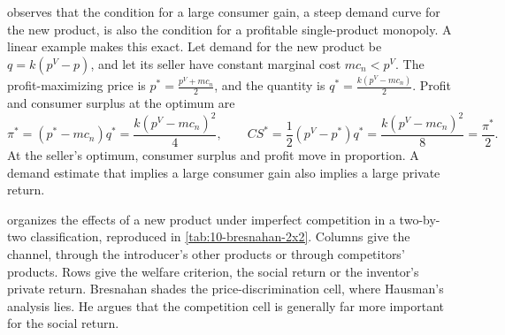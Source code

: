 \begin{remark}\label{rem:10-steep}
\citet[p.~243]{Bresnahan1997} observes that the condition for a large consumer gain, a steep demand curve for
the new product, is also the condition for a profitable single-product monopoly. A linear example makes this
exact. Let demand for the new product be $q = k(p^V - p)$, and let its seller have constant marginal cost
$mc_n < p^V$. The profit-maximizing price is $p^* = \frac{p^V + mc_n}{2}$, and the quantity is
$q^* = \frac{k(p^V - mc_n)}{2}$. Profit and consumer surplus at the optimum are
\begin{equation*}
  \pi^* = (p^* - mc_n)q^* = \frac{k(p^V - mc_n)^2}{4}, \qquad
  CS^* = \frac{1}{2}(p^V - p^*)q^* = \frac{k(p^V - mc_n)^2}{8} = \frac{\pi^*}{2}.
\end{equation*}
At the seller's optimum, consumer surplus and profit move in proportion. A demand estimate that implies a large
consumer gain also implies a large private return.
\end{remark}

\citet[pp.~245--246]{Bresnahan1997} organizes the effects of a new product under imperfect competition in a
two-by-two classification, reproduced in \cref{tab:10-bresnahan-2x2}. Columns give the channel, through the
introducer's other products or through competitors' products. Rows give the welfare criterion, the social
return or the inventor's private return. Bresnahan shades the price-discrimination cell, where Hausman's
analysis lies. He argues that the competition cell is generally far more important for the social return.

